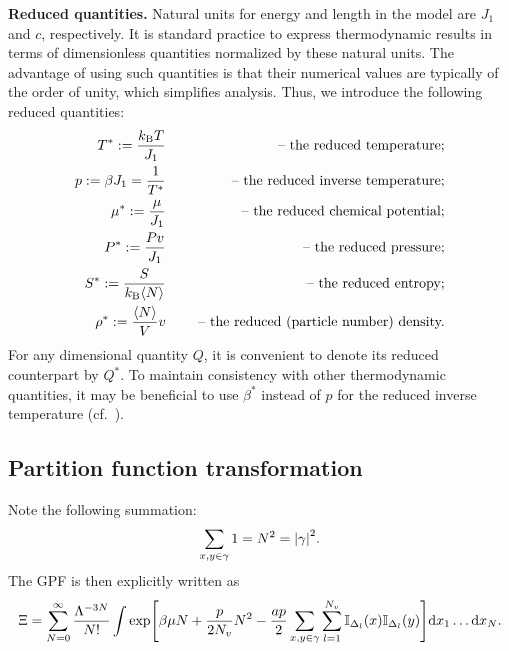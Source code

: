 \documentclass[12pt]{article}
\numberwithin{equation}{section}
\begin{document}
	\textbf{Reduced quantities.} Natural units for energy and length in the model are $J_1$ and $c$, respectively. It is standard practice to express thermodynamic results in terms of dimensionless quantities normalized by these natural units. The advantage of using such quantities is that their numerical values are typically of the order of unity, which simplifies analysis. Thus, we introduce the following reduced quantities:
	\begin{eqnarray}
		\label{def:reduced}
		T^* := \frac{k_{\rm B} T}{J_1} & \quad & \text{ -- the reduced temperature;} 
		\nonumber\\
		p := \beta J_1 = \frac{1}{T^*} & \quad & \text{ -- the reduced inverse temperature;}
		\nonumber\\
		\mu^* := \frac{\mu}{J_1} & \quad & \text{ -- the reduced chemical potential;}
		\nonumber\\ 
		P^* := \frac{Pv}{J_1} & & \text{ -- the reduced pressure;}
		\nonumber\\
		S^* := \frac{S}{k_{\rm B} \langle N \rangle} & & \text{ -- the reduced entropy;}
		\nonumber\\
		\rho^* := \frac{\langle N \rangle}{V} v && \text{ -- the reduced (particle number) density.}
	\end{eqnarray}
	For any dimensional quantity $Q$, it is convenient to denote its reduced counterpart by $Q^*$. To maintain consistency with other thermodynamic quantities, it may be beneficial to use $\beta^*$ instead of $p$ for the reduced inverse temperature (cf.~\cite{RDGMR13}).
	
	\subsection{Partition function transformation}
	Note the following summation:
	\begin{equation}
		\sum_{x,y \in \gamma} 1 = N^2 = \abs{\gamma}^2.
	\end{equation}
	The GPF is then explicitly written as
	\begin{equation}
		\label{eq:gpf1}
		\Xi = \sum_{N=0}^{\infty} \frac{\Lambda^{-3N}}{N!}\int \exp[\beta\mu N + \frac{p}{2N_{v}} N^2 - \frac{ap}{2} \sum_{x,y \in \gamma} \sum_{l=1}^{N_v} \mathbb{I}_{\Delta_l}(x)\mathbb{I}_{\Delta_l}(y)] {\rm d} x_1 \dotsc {\rm d} x_N.
	\end{equation}
	
\end{document}
